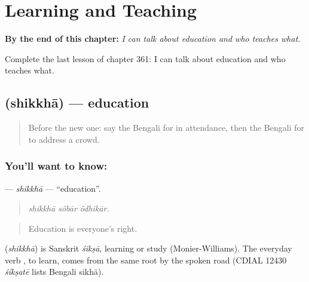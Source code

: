 
\chapter{Learning and Teaching}
\label{ch:bn-learning-and-teaching}

\begin{chapteropening}
\textbf{By the end of this chapter:} \emph{I can talk about education and who teaches what.}

Complete the last lesson of chapter 361: I can talk about education and who teaches what.
\end{chapteropening}

\section[\texorpdfstring{\bn{শিক্ষা} (shikkhā)}{শিক্ষা (shikkhā)}]{ (shikkhā) — education}

\label{lesson:BN-C361-shikkha}



\begin{quote}
Before the new one: say the Bengali for in attendance, then the Bengali for to address a crowd.
\end{quote}

\subsection*{You'll want to know: }
\textbf{} — \emph{shikkhā} — \textquotedblleft{}education\textquotedblright{}.

\begin{quote}
  
\end{quote}

\begin{quote}
\emph{shikkhā sôbār ôdhikār.}
\end{quote}

\begin{quote}
Education is everyone's right.
\end{quote}

\begin{cousinweb}
\textbf{} (\emph{shikkhā}) is Sanskrit \emph{śikṣā}, learning or study (Monier-Williams). The everyday verb , to learn, comes from the same root by the spoken road (CDIAL 12430 \emph{śíkṣatē} lists Bengali sikhā).
\end{cousinweb}

